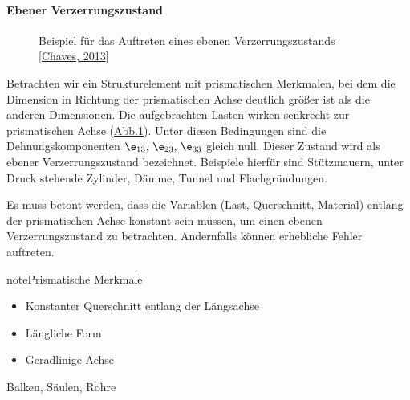 \documentclass[letterpaper,10pt,german]{jupyterBook}
\let\sphinxpxdimen\pdfpxdimen\else\newdimen\sphinxpxdimen
\begin{document}
\paragraph{Ebener Verzerrungszustand}
\label{\detokenize{chapters/chapter1/elasticity:ebener-verzerrungszustand}}
\begin{figure}[htbp]
\centering
\capstart

\noindent\sphinxincludegraphics[height=300\sphinxpxdimen]{{EVZ}.png}
\caption{Beispiel für das Auftreten eines ebenen Verzerrungszustands {[}\hyperlink{cite.quellen:id10}{Chaves, 2013}{]}}\label{\detokenize{chapters/chapter1/elasticity:evz}}\end{figure}

\sphinxAtStartPar
Betrachten wir ein Strukturelement mit prismatischen Merkmalen, bei dem die Dimension in Richtung der prismatischen Achse deutlich größer ist als die anderen Dimensionen. Die aufgebrachten Lasten wirken senkrecht zur prismatischen Achse (\hyperref[\detokenize{chapters/chapter1/elasticity:evz}]{Abb.\@ \ref{\detokenize{chapters/chapter1/elasticity:evz}}}). Unter diesen Bedingungen sind die Dehnungskomponenten \(\e_{13},\, \e_{23}, \, \e_{33}\) gleich null. Dieser Zustand wird als ebener Verzerrungszustand bezeichnet. Beispiele hierfür sind Stützmauern, unter Druck stehende Zylinder, Dämme, Tunnel und Flachgründungen.

\sphinxAtStartPar
Es muss betont werden, dass die Variablen (Last, Querschnitt, Material) entlang der prismatischen Achse konstant sein müssen, um einen ebenen Verzerrungszustand zu betrachten. Andernfalls können erhebliche Fehler auftreten.

\begin{sphinxadmonition}{note}{Prismatische Merkmale}
\begin{itemize}
\item {} 
\sphinxAtStartPar
Konstanter Querschnitt entlang der Längsachse

\item {} 
\sphinxAtStartPar
Längliche Form

\item {} 
\sphinxAtStartPar
Geradlinige Achse

\end{itemize}

\sphinxAtStartPar
{} Balken, Säulen, Rohre
\end{sphinxadmonition}
\end{document}
